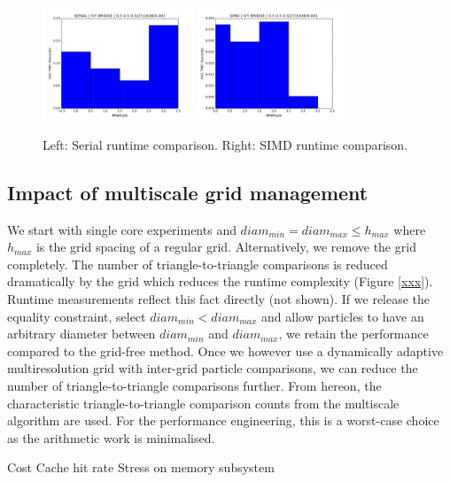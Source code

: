 \begin{figure}
  \begin{center}
    \includegraphics[width=0.4\textwidth]{experiments/vectorisation/plots/serial.png}
    \hspace{0.2cm}
    \includegraphics[width=0.4\textwidth]{experiments/vectorisation/plots/simd.png}
  \end{center}
  \caption{
    Left: Serial runtime comparison.
    Right: SIMD runtime comparison.
  }
  \label{figure:particle_hull}
\end{figure}

\clearpage

\subsection{Impact of multiscale grid management}

We start with single core experiments and $diam_{min} = diam_{max} \leq
h_{max}$ where $h_{max}$ is the grid spacing of a regular grid.
Alternatively, we remove the grid completely.
The number of triangle-to-triangle comparisons is reduced dramatically by the
grid which reduces the runtime complexity (Figure \ref{xxx}).
Runtime measurements reflect this fact directly (not shown).
If we release the equality constraint, select $diam_{min} < diam_{max}$ and
allow particles to have an arbitrary diameter between $diam_{min}$ and
$diam_{max}$, we retain the performance compared to the grid-free method.
Once we however use a dynamically adaptive multiresolution grid with inter-grid
particle comparisons, we can reduce the number of triangle-to-triangle
comparisons further. 
From hereon, the characteristic triangle-to-triangle comparison counts from the
multiscale algorithm are used.
For the performance engineering, this is a worst-case choice as the arithmetic
work is minimalised.



Cost
Cache hit rate
Stress on memory subsystem
